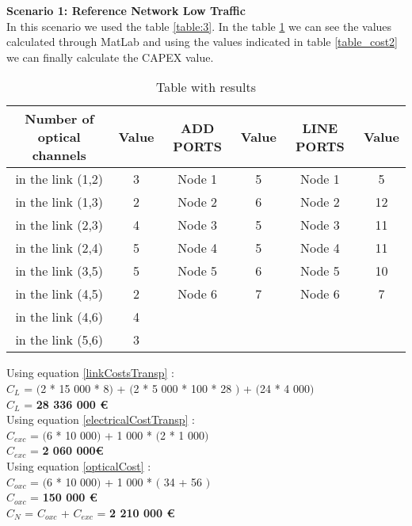 \textbf{Scenario 1: Reference Network Low Traffic} \label{Scenario1_transp} \\
In this scenario we used the table \ref{table:3}. In the table \ref{result_ILP1_T} we can see the values calculated through MatLab and using the values indicated in table \ref{table_cost2} we can finally calculate the CAPEX value. \\
\newpage
\begin{table}[h!]
\centering
\begin{tabular}{|| c | c || c | c || c | c ||}
 \hline
 Number of optical channels & Value & ADD PORTS & Value & LINE PORTS & Value \\
 \hline\hline
 in the link (1,2) & 3 & Node 1 & 5 & Node 1 & 5 \\
 in the link (1,3) & 2 & Node 2 & 6 & Node 2 & 12 \\
 in the link (2,3) & 4 & Node 3 & 5 & Node 3 & 11 \\
 in the link (2,4) & 5 & Node 4 & 5 & Node 4 & 11 \\
 in the link (3,5) & 5 & Node 5 & 6 & Node 5 & 10 \\
 in the link (4,5) & 2 & Node 6 & 7 & Node 6 & 7 \\
 in the link (4,6) & 4 & & & & \\
 in the link (5,6) & 3 & & & & \\
 \hline
\end{tabular}
\caption{Table with results}
\label{result_ILP1_T}
\end{table}

Using equation \ref{linkCostsTransp} : \\
$C_L$ = $($2 * 15 000 * 8$)$ + $($2 * 5 000 * 100 * 28 $)$ + $($24 * 4 000$)$ \\
$C_L$ = \textbf{28 336 000 \euro} \\

Using equation \ref{electricalCostTransp} : \\
$C_{exc}$ = $($6 * 10 000$)$ + 1 000 * $($2 * 1 000$)$ \\
$C_{exc}$ = \textbf{2 060 000\euro} \\

Using equation \ref{opticalCost} : \\
$C_{oxc}$ = $($6 * 10 000$)$ + 1 000 * $($ 34 + 56 $)$ \\
$C_{oxc}$ = \textbf{150 000 \euro} \\
$C_N$ = $C_{oxc}$ + $C_{exc}$ = \textbf{2 210 000 \euro} \\

